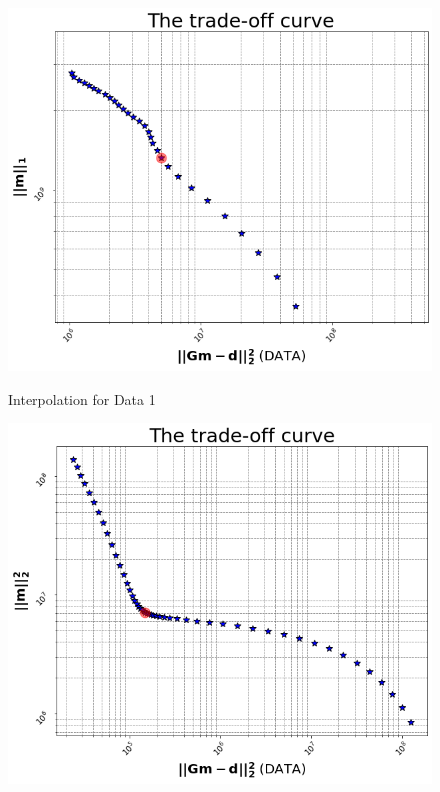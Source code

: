 \documentclass{article}
\begin{document}
\begin{figure}[!htb]
   \begin{minipage}{0.33\textwidth}
     \centering
     \includegraphics[width=.8\linewidth]{figures/LASSO_Trade_Off_100_Zoomed_In_USING.png}
     \caption{Interpolation for Data 1}\label{Fig:Data1}
   \end{minipage}\hfill
   \begin{minipage}{0.33\textwidth}
     \centering
     \includegraphics[width=.8\linewidth]{figures/Ridge_Trade_Off_USING.png}
     \caption{Interpolation for Data 2}\label{Fig:Data2}
   \end{minipage}
   \begin{minipage}{0.33\textwidth}
     \centering
     \begin{table}
      \centering
      \begin{tabular}{lll}
        \toprule

\end{tabular}
\end{table}
\end{minipage}
\end{figure}
\end{document}
